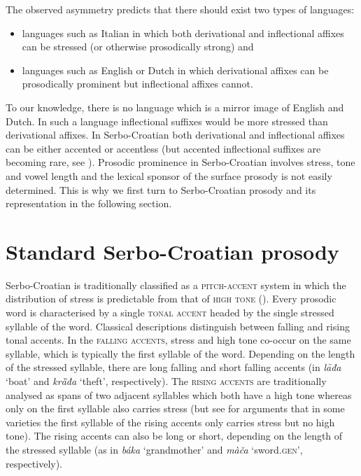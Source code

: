 \documentclass[output=paper]{langsci/langscibook}
\begin{document}
The observed asymmetry predicts that there should exist two types of languages: 
\begin{itemize}
  \item languages such as Italian in which both derivational and inflectional affixes can be stressed (or otherwise prosodically strong) and
\item languages such as English or Dutch in which derivational affixes can be prosodically prominent but inflectional affixes cannot.\end{itemize}
To our knowledge, there is no language which is a mirror image of English and Dutch. In such a language inflectional suffixes would be more stressed than derivational affixes. 
In Serbo-Croatian both derivational and inflectional affixes can be either accented or accentless (but accented inflectional suffixes are becoming rare, see \citealt{SimKa2018}). Prosodic prominence in Serbo-Croatian involves stress, tone and vowel length and the lexical sponsor of the surface prosody is not easily determined. This is why we first turn to Serbo-Croatian prosody and its representation in the following section.  

\section{Standard Serbo-Croatian prosody
} \label{sec:simonovic:3}

Serbo-Croatian is traditionally classified as a \textsc{pitch-accent} system in which the distribution of stress is predictable from that of \textsc{high tone} (\citealt{Zec1988, Zec1999}). Every prosodic word is characterised by a single \textsc{tonal accent} headed by the single stressed syllable of the word. Classical descriptions distinguish between falling and rising tonal accents. In the \textsc{falling accents}, stress and high tone co-occur on the same syllable, which is typically the first syllable of the word. Depending on the length of the stressed syllable, there are long falling and short falling accents (in \textit{lȃđa} `boat' and \textit{krȁđa} `theft', respectively). The \textsc{rising accents} are traditionally analysed as spans of two adjacent syllables which both have a high tone whereas only on the first syllable also carries stress (but see \citealt{Zsiga-Zec2013} for arguments that in some varieties the first syllable of the rising accents only carries stress but no high tone). The rising accents can also be long or short, depending on the length of the stressed syllable (as in \textit{báka} `grandmother' and \textit{màča} `sword.\textsc{gen}', respectively). 
\end{document}
